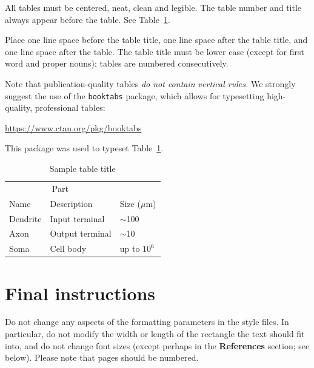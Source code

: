 \documentclass{article}
\begin{document}
All tables must be centered, neat, clean and legible.  The table number and
title always appear before the table.  See Table~\ref{sample-table}.

Place one line space before the table title, one line space after the
table title, and one line space after the table. The table title must
be lower case (except for first word and proper nouns); tables are
numbered consecutively.

Note that publication-quality tables \emph{do not contain vertical rules.} We
strongly suggest the use of the \verb+booktabs+ package, which allows for
typesetting high-quality, professional tables:
\begin{center}
  \url{https://www.ctan.org/pkg/booktabs}
\end{center}
This package was used to typeset Table~\ref{sample-table}.

\begin{table}
  \caption{Sample table title}
  \label{sample-table}
  \centering
  \begin{tabular}{lll}
    \toprule
    \multicolumn{2}{c}{Part}                   \\
    \cmidrule(r){1-2}
    Name     & Description     & Size ($\mu$m) \\
    \midrule
    Dendrite & Input terminal  & $\sim$100     \\
    Axon     & Output terminal & $\sim$10      \\
    Soma     & Cell body       & up to $10^6$  \\
    \bottomrule
  \end{tabular}
\end{table}

\section{Final instructions}

Do not change any aspects of the formatting parameters in the style files.  In
particular, do not modify the width or length of the rectangle the text should
fit into, and do not change font sizes (except perhaps in the
\textbf{References} section; see below). Please note that pages should be
numbered.






\end{document}
